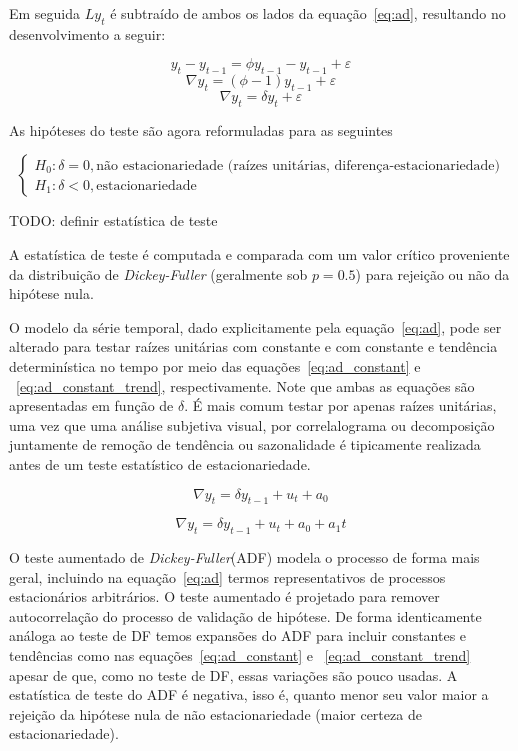 Em seguida $Ly_t$ é subtraído de ambos os lados da equação~\ref{eq:ad},
resultando no desenvolvimento a seguir:

$$ y_t - y_{t-1} = \phi y_{t-1} - y_{t-1} + \varepsilon $$
$$ \nabla y_t = (\phi - 1) y_{t-1}  + \varepsilon $$
$$ \nabla y_t = \delta y_t  + \varepsilon $$

As hipóteses do teste são agora reformuladas para as seguintes

$$
\begin{cases}
    H_0: \delta = 0, \text{não estacionariedade (raízes unitárias, diferença-estacionariedade)} \\
    H_1: \delta < 0, \text{estacionariedade}
\end{cases}
$$

TODO: definir estatística de teste

A estatística de teste é computada e comparada com um valor crítico proveniente
da distribuição de \emph{Dickey-Fuller} (geralmente sob $p=0.5$) para rejeição
ou não da hipótese nula.

O modelo da série temporal, dado explicitamente pela equação~\ref{eq:ad}, pode
ser alterado para testar raízes unitárias com constante e com constante e
tendência determinística no tempo por meio das equações~\ref{eq:ad_constant} e
~\ref{eq:ad_constant_trend}, respectivamente. Note que ambas as equações são
apresentadas em função de $\delta$. É mais comum testar por apenas raízes
unitárias, uma vez que uma análise subjetiva visual, por correlalograma ou
decomposição juntamente de remoção de tendência ou sazonalidade é tipicamente
realizada antes de um teste estatístico de estacionariedade.

\begin{equation}\label{eq:ad_constant}
    \nabla y_t = \delta y_{t-1} + u_t + a_0
\end{equation}

\begin{equation}\label{eq:ad_constant_trend}
    \nabla y_t = \delta y_{t-1} + u_t + a_0 + a_1 t
\end{equation}

O teste aumentado de \emph{Dickey-Fuller}(ADF) modela o processo de forma mais
geral, incluindo na equação~\ref{eq:ad} termos representativos de processos
estacionários arbitrários. O teste aumentado é projetado para remover
autocorrelação do processo de validação de hipótese. De forma identicamente
análoga ao teste de DF temos expansões do ADF para incluir constantes e
tendências como nas equações~\ref{eq:ad_constant} e
~\ref{eq:ad_constant_trend} apesar de que, como no teste de DF, essas
variações são pouco usadas. A estatística de teste do ADF é negativa, isso é,
quanto menor seu valor maior a rejeição da hipótese nula de não
estacionariedade (maior certeza de estacionariedade).

